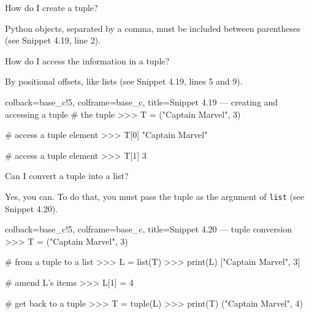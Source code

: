 \documentclass[a4paper,11pt]{book}
\newcommand{\question}[1]{%
    \begin{tcolorbox}[colback=comp_c!10,colframe=comp_c,sidebyside align=top,width=\linewidth,before skip=1ex]
        #1
    \end{tcolorbox}
    \switchcolumn%
}
\newcommand{\note}[1]{%
    \begin{tcolorbox}[colback=white!0,colframe=white!10,width=\linewidth,before skip=1ex]
        #1
    \end{tcolorbox}
}
\begin{document}
\begin{paracol}{2}
	\question{\raggedright How do I create a tuple?}
	\note{Python objects, separated by a comma, must be included between parentheses (see Snippet 4.19, line 2).}
\end{paracol}

\begin{paracol}{2}
	\question{\raggedright How do I access the information in a tuple?}
	\note{By positional offsets, like lists (see Snippet 4.19, lines 5 and 9).}
\end{paracol}

\begin{pythoncode}[linenos=true,]{colback=base_c!5, colframe=base_c, title=\sffamily Snippet 4.19 --- creating and accessing a tuple}
# the tuple
>>> T = ("Captain Marvel", 3)

# access a tuple element
>>> T[0]
"Captain Marvel"

# access a tuple element
>>> T[1]
3
\end{pythoncode}

\begin{paracol}{2}
	\question{\raggedright Can I convert a tuple into a list?}
	\note{Yes, you can. To do that, you must pass the tuple as the argument of \texttt{list} (see Snippet 4.20).}
\end{paracol}

\begin{pythoncode}[linenos=true,]{colback=base_c!5, colframe=base_c, title=\sffamily Snippet 4.20 --- tuple conversion}
>>> T = ("Captain Marvel", 3)

# from a tuple to a list
>>> L = list(T)
>>> print(L)
["Captain Marvel", 3]

# amend L's items
>>> L[1] = 4

# get back to a tuple
>>> T = tuple(L)
>>> print(T)
("Captain Marvel", 4)
\end{pythoncode}
\clearpage
\end{document}
